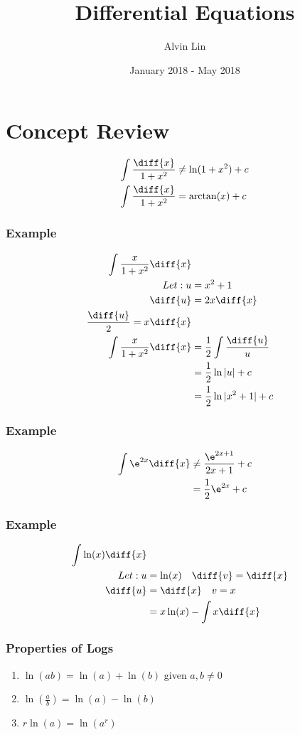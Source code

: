 \documentclass{math}
\title{Differential Equations}
\author{Alvin Lin}
\date{January 2018 - May 2018}
\begin{document}
\maketitle

\section*{Concept Review}
\begin{align*}
  \int\frac{\diff{x}}{1+x^2} &\ne \ln(1+x^2)+c \\
  \int\frac{\diff{x}}{1+x^2} &= \arctan(x)+c
\end{align*}

\subsubsection*{Example}
\begin{align*}
  \int\frac{x}{1+x^2}\diff{x} \\
  Let: u &= x^2+1 \\
  \diff{u} &= 2x\diff{x} \\
  \frac{\diff{u}}{2} = x\diff{x} \\
  \int\frac{x}{1+x^2}\diff{x} &= \frac{1}{2}\int\frac{\diff{u}}{u} \\
  &= \frac{1}{2}\ln|u|+c \\
  &= \frac{1}{2}\ln|x^2+1|+c
\end{align*}

\subsubsection*{Example}
\begin{align*}
  \int\e^{2x}\diff{x} &\ne \frac{\e^{2x+1}}{2x+1}+c \\
  &= \frac{1}{2}\e^{2x}+c
\end{align*}

\subsubsection*{Example}
\begin{align*}
  \int\ln(x)\diff{x} \\
  Let: u &= \ln(x) \quad \diff{v} = \diff{x} \\
  \diff{u} &= \diff{x} \quad v = x \\
  &= x\ln(x)-\int{x\diff{x}}
\end{align*}

\subsubsection*{Properties of Logs}
\begin{enumerate}
  \item \( \ln(ab) = \ln(a)+\ln(b) \) given \( a,b\ne0 \)
  \item \( \ln(\frac{a}{b}) = \ln(a)-\ln(b) \)
  \item \( r\ln(a) = \ln(a^r) \)
\end{enumerate}
\end{document}
